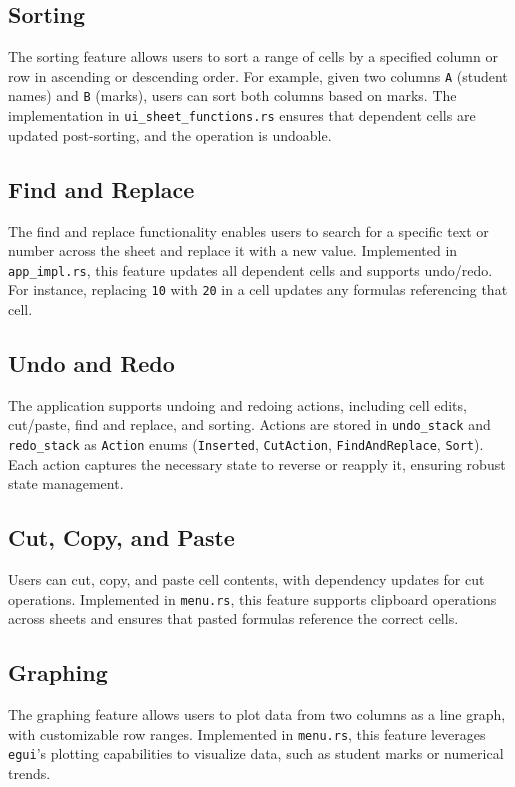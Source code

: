 \documentclass{article}
\begin{document}
\subsection{Sorting}
The sorting feature allows users to sort a range of cells by a specified column or row in ascending or descending order. For example, given two columns \texttt{A} (student names) and \texttt{B} (marks), users can sort both columns based on marks. The implementation in \texttt{ui\_sheet\_functions.rs} ensures that dependent cells are updated post-sorting, and the operation is undoable.

\subsection{Find and Replace}
The find and replace functionality enables users to search for a specific text or number across the sheet and replace it with a new value. Implemented in \texttt{app\_impl.rs}, this feature updates all dependent cells and supports undo/redo. For instance, replacing \texttt{10} with \texttt{20} in a cell updates any formulas referencing that cell.

\subsection{Undo and Redo}
The application supports undoing and redoing actions, including cell edits, cut/paste, find and replace, and sorting. Actions are stored in \texttt{undo\_stack} and \texttt{redo\_stack} as \texttt{Action} enums (\texttt{Inserted}, \texttt{CutAction}, \texttt{FindAndReplace}, \texttt{Sort}). Each action captures the necessary state to reverse or reapply it, ensuring robust state management.

\subsection{Cut, Copy, and Paste}
Users can cut, copy, and paste cell contents, with dependency updates for cut operations. Implemented in \texttt{menu.rs}, this feature supports clipboard operations across sheets and ensures that pasted formulas reference the correct cells.

\subsection{Graphing}
The graphing feature allows users to plot data from two columns as a line graph, with customizable row ranges. Implemented in \texttt{menu.rs}, this feature leverages \texttt{egui}'s plotting capabilities to visualize data, such as student marks or numerical trends.
\end{document}
